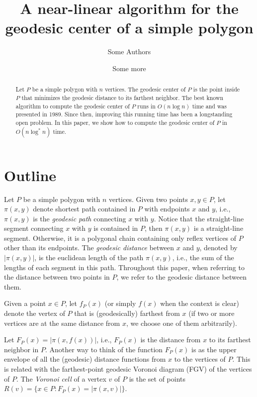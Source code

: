 \documentclass[a4paper,UKenglish]{lipics}
\title{A near-linear algorithm for the geodesic center of a simple polygon}
\author[1]{Some Authors}
\author[2]{Some more}
\affil[1]{Dummy University Computing Laboratory\\
  Address, Country\\
  \texttt{open@dummyuni.org}}
\affil[2]{Department of Informatics, Dummy College\\
  Address, Country\\
  \texttt{access@dummycollege.org}}
\newcommand{\F}[2]{\ensuremath{F_{\scriptscriptstyle #1}(#2)}}
\newcommand{\f}[2]{\ensuremath{f_{\scriptscriptstyle #1}(#2)}}
\newcommand{\ff}[1]{\ensuremath{f(#1)}}
\newcommand{\g}[2]{\ensuremath{|\pi(#1, #2)|}}
\newcommand{\p}[2]{\ensuremath{\pi(#1, #2)}}
\begin{document}
\maketitle

\begin{abstract}
Let $P$ be a simple polygon with $n$ vertices. 
The geodesic center of $P$ is the point inside $P$ that minimizes the geodesic distance to its farthest neighbor. 
The best known algorithm to compute the geodesic center of $P$ runs in $O(n \log n)$ time and was presented in 1989. 
Since then, improving this running time has been a longstanding open problem.
In this paper, we show how to compute the geodesic center of $P$ in $O(n\log ^* n)$ time.
\end{abstract}



\section{Outline}

Let $P$ be a simple polygon with $n$ vertices. 
Given two points $x,y\in P$, let $\p{x}{y}$ denote shortest path contained in $P$ with endpoints $x$ and $y$, i.e., $\p{x}{y}$ is the \emph{geodesic path} connecting $x$ with $y$. Notice that the straight-line segment connecting $x$ with $y$ is contained in $P$, then $\p{x}{y}$ is a straight-line segment. Otherwise, it is a polygonal chain containing only reflex vertices of $P$ other than its endpoints.
The \emph{geodesic distance} between $x$ and $y$, denoted by $\g{x}{y}$, is the euclidean length of the path $\p{x}{y}$, i.e., the sum of the lengths of each segment in this path.
Throughout this paper, when referring to the distance between two points in $P$, we refer to the geodesic distance between them.

Given a point $x\in P$, let $\f{P}{x}$ (or simply $\ff{x}$ when the context is clear) denote the vertex of $P$ that is (geodesically) farthest from $x$ (if two or more vertices are at the same distance from $x$, we choose one of them arbitrarily). 


Let $\F{P}{x} = \g{x}{\ff{x}}$, i.e., $\F{P}{x}$ is the distance from $x$ to its farthest neighbor in $P$. 
Another way to think of the function $\F{P}{x}$ is as the upper envelope of all the (geodesic) distance functions from $x$ to the vertices of $P$. This is related with the farthest-point geodesic Voronoi diagram (FGV) of the vertices of $P$. The \emph{Voronoi cell} of a vertex $v$ of $P$ is the set of points $R(v) = \{x\in P : \F{P}{x} = \g{x}{v}\}$.
\end{document}
